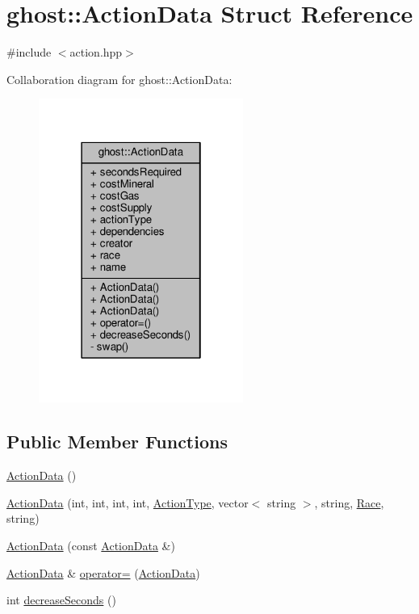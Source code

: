 \hypertarget{structghost_1_1ActionData}{\section{ghost\-:\-:Action\-Data Struct Reference}
\label{structghost_1_1ActionData}
}


{\ttfamily \#include $<$action.\-hpp$>$}



Collaboration diagram for ghost\-:\-:Action\-Data\-:
\nopagebreak
\begin{figure}[H]
\begin{center}
\leavevmode
\includegraphics[width=190pt]{structghost_1_1ActionData__coll__graph}
\end{center}
\end{figure}
\subsection*{Public Member Functions}
\begin{DoxyCompactItemize}
\item 
\hyperlink{structghost_1_1ActionData_a398c0229d2a28285a23e7b204d40f035}{Action\-Data} ()
\item 
\hyperlink{structghost_1_1ActionData_aafadfe3fb13e65643800fb94c391a8b4}{Action\-Data} (int, int, int, int, \hyperlink{namespaceghost_a7c0deb8266504feb7d025903f2b77693}{Action\-Type}, vector$<$ string $>$, string, \hyperlink{namespaceghost_a8b1db75c40c6980adcf244ddccc0324b}{Race}, string)
\item 
\hyperlink{structghost_1_1ActionData_a82077aaab28abb47564a5b17ff93d8e6}{Action\-Data} (const \hyperlink{structghost_1_1ActionData}{Action\-Data} \&)
\item 
\hyperlink{structghost_1_1ActionData}{Action\-Data} \& \hyperlink{structghost_1_1ActionData_ab27ef39d95bd64bf7c54c3819d2cfd5d}{operator=} (\hyperlink{structghost_1_1ActionData}{Action\-Data})
\item 
int \hyperlink{structghost_1_1ActionData_a4aa14dfd0d1ef6834cb98373ea18f68f}{decrease\-Seconds} ()
\end{DoxyCompactItemize}
